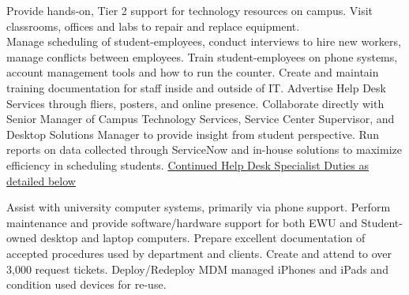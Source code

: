 \documentclass[]{deedy-resume-openfont}
\begin{document}
\begin{minipage}[t]{0.66\textwidth}
\sectionsep
{}
Provide hands-on, Tier 2 support for technology resources on campus. Visit classrooms, offices and labs to repair and replace equipment.
\sectionsep \\
Manage scheduling of student-employees, conduct interviews to hire new workers, manage conflicts between employees. Train student-employees on phone systems, account management tools and how to run the counter. Create and maintain training documentation for staff inside and outside of IT. Advertise Help Desk Services through fliers, posters, and online presence. Collaborate directly with Senior Manager of Campus Technology Services, Service Center Supervisor, and Desktop Solutions Manager to provide insight from student perspective. Run reports on data collected through ServiceNow and in-house solutions to maximize efficiency in scheduling students. 
\underline{Continued Help Desk Specialist Duties as detailed below}\\ 

\sectionsep

Assist with university computer systems, primarily via phone support. Perform maintenance and provide software/hardware support for both EWU and Student-owned desktop and laptop computers. Prepare excellent documentation of accepted procedures used by department and clients. Create and attend to over 3,000 request tickets. Deploy/Redeploy MDM managed iPhones and iPads and condition used devices for re-use.


\end{minipage}
\end{document}
